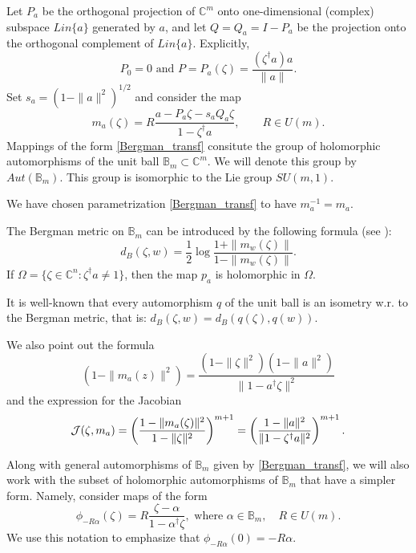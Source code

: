 \documentclass{article}
\theoremstyle{plain}%
\theoremstyle{definition}
\theoremstyle{remark}
\theoremstyle{prop}
\begin{document}
Let $P_a$ be the
orthogonal projection of $\mathbb{C}^m$ onto one-dimensional (complex) subspace $Lin \{a \}$ generated by $a$, and let $Q=Q_a =
I - P_a$ be the projection onto the orthogonal complement of $Lin\{a\}$. Explicitly, 
$$
P_0 = 0 \mbox{   and  }  P=P_a(\zeta) =\frac{(\zeta^\dagger a) a}{ \| a\|}.
$$
 Set $s_a = (1 - \|a\|^2)^{1/2}$ and consider the map
\begin{equation}
\label{Bergman_transf}
m_a(\zeta) = R \frac{a-P_a \zeta-s_a Q_a \zeta}{1- \zeta^\dagger a}, \qquad R \in U(m).
\end{equation}
Mappings of the form \eqref{Bergman_transf} consitute the group of holomorphic automorphisms of the unit ball $\mathbb{B}_m \subset \mathbb{C}^m$. We will denote this group by $Aut(\mathbb{B}_m)$. This group is isomorphic to the Lie group $SU(m,1)$. 

We have chosen parametrization \eqref{Bergman_transf} to have $m_a^{-1}=m_a$. 


The Bergman metric on $\mathbb B_m$ can be introduced by the following formula (see \cite[Proposition~1.21]{kezu}): 
\begin{equation}
\label{bergmet}
d_B(\zeta,w)=\frac{1}{2}\log\frac{1+ \| m_w(\zeta) \|}{1- \| m_w(\zeta) \|}.
\end{equation}
If $\Omega= \{\zeta \in \mathbb{C}^n: \zeta^\dagger a \neq 1\}$,  then the map $p_a$  is holomorphic in $\Omega$.

It is well-known that every automorphism $q$ of the unit ball is an isometry w.r. to the Bergman metric, that is: $d_B(\zeta,w)=d_B(q(\zeta),q(w))$.

We also point out the formula 
\begin{equation}
\label{phia}
(1-\| m_a(z)\|^2)=\frac{(1-\|\zeta \|^2)(1-\|a\|^2)}{\|1- a^\dagger \zeta \|^2}\end{equation} and the expression for the Jacobian
$$
{\cal J}(\zeta,m_a)=\left(\frac{1-\|m_a(\zeta)\|^2}{1-\|\zeta\|^2}\right)^{m+1}=\left(\frac{1-\|a\|^2}{\|1-\zeta^\dagger a\|^2}\right)^{m+1}.
$$

Along with general automorphisms of $\mathbb{B}_m$ given by \eqref{Bergman_transf}, we will also work with the subset of holomorphic automorphisms of $\mathbb B_m$ that have a simpler form. Namely, consider maps of the form
\begin{equation}
\label{holomorphic_reduced}
\phi_{- R \alpha}(\zeta) = R \frac{\zeta - \alpha}{1 - \alpha^\dagger \zeta}, \mbox{  where } \alpha \in \mathbb B_m, \quad R \in U(m).
\end{equation}
We use this notation to emphasize that $\phi_{-R \alpha}(0) = -R \alpha$.
\end{document}
